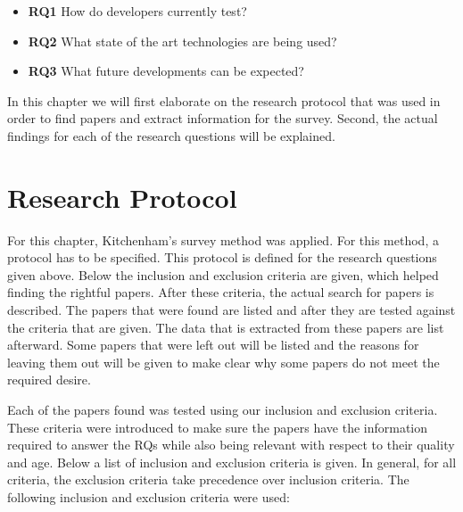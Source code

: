 \documentclass[]{book}
\providecommand{\tightlist}{%
  \setlength{\itemsep}{0pt}\setlength{\parskip}{0pt}}
\begin{document}
\begin{itemize}
\tightlist
\item
  \textbf{RQ1} How do developers currently test?
\item
  \textbf{RQ2} What state of the art technologies are being used?
\item
  \textbf{RQ3} What future developments can be expected?
\end{itemize}

In this chapter we will first elaborate on the research protocol that
was used in order to find papers and extract information for the survey.
Second, the actual findings for each of the research questions will be
explained.

\section{Research Protocol}\label{research-protocol}

For this chapter, Kitchenham's survey method \cite{Kitchenham2004} was
applied. For this method, a protocol has to be specified. This protocol
is defined for the research questions given above. Below the inclusion
and exclusion criteria are given, which helped finding the rightful
papers. After these criteria, the actual search for papers is described.
The papers that were found are listed and after they are tested against
the criteria that are given. The data that is extracted from these
papers are list afterward. Some papers that were left out will be listed
and the reasons for leaving them out will be given to make clear why
some papers do not meet the required desire.

Each of the papers found was tested using our inclusion and exclusion
criteria. These criteria were introduced to make sure the papers have
the information required to answer the RQs while also being relevant
with respect to their quality and age. Below a list of inclusion and
exclusion criteria is given. In general, for all criteria, the exclusion
criteria take precedence over inclusion criteria. The following
inclusion and exclusion criteria were used:
\end{document}
